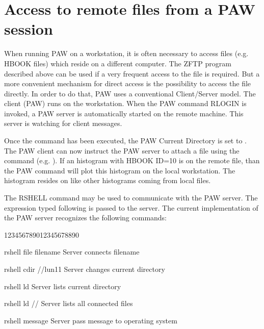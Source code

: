 \section{Access to remote files from a PAW session}
 
When running PAW on a workstation, it is often necessary to access files
(e.g. HBOOK files) which reside on a different computer. The ZFTP program described
above can be used if a very frequent access to the file is required. But a
more convenient mechanism for direct access is the possibility to access the file directly.
In order to do that, PAW uses a conventional Client/Server model. The client
(PAW) runs on the workstation. When the PAW command RLOGIN is invoked,
a PAW server is automatically started on the remote machine. This server
is watching for client messages.
 
Once the  command has been executed, the PAW Current Directory
is set to . The PAW client can now instruct the PAW server to
attach a file using the  command (e.g. ). If an
histogram with HBOOK ID=10 is on the remote file, than the PAW command
will plot this histogram on the local workstation. The histogram resides
on  like other histograms coming from local files.
 
The RSHELL command may be used to communicate with the PAW server.
The expression typed following  is passed to the server. The current
implementation of the PAW server recognizes the following commands:
\begin{DLtt}{123456789012345678890}
\item[rshell file filename]Server connects filename
\item[rshell cdir //lun11] Server changes current directory
\item[rshell ld]           Server lists current directory
\item[rshell ld //]        Server lists all connected files
\item[rshell message]      Server pass message to operating system
\end{DLtt}
 
